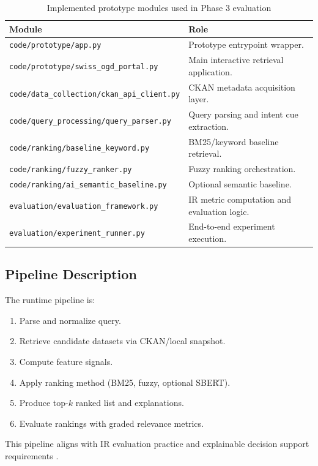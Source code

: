 \documentclass[11pt,a4paper]{article}
\begin{document}
\begin{table}[H]
\centering
\begin{tabular}{p{} p{}}
\toprule
\textbf{Module} & \textbf{Role} \\
\midrule
\texttt{code/prototype/app.py} & Prototype entrypoint wrapper. \\
\texttt{code/prototype/swiss\_ogd\_portal.py} & Main interactive retrieval application. \\
\texttt{code/data\_collection/ckan\_api\_client.py} & CKAN metadata acquisition layer. \\
\texttt{code/query\_processing/query\_parser.py} & Query parsing and intent cue extraction. \\
\texttt{code/ranking/baseline\_keyword.py} & BM25/keyword baseline retrieval. \\
\texttt{code/ranking/fuzzy\_ranker.py} & Fuzzy ranking orchestration. \\
\texttt{code/ranking/ai\_semantic\_baseline.py} & Optional semantic baseline. \\
\texttt{evaluation/evaluation\_framework.py} & IR metric computation and evaluation logic. \\
\texttt{evaluation/experiment\_runner.py} & End-to-end experiment execution. \\
\bottomrule
\end{tabular}
\caption{Implemented prototype modules used in Phase 3 evaluation}
\label{tab:modules}
\end{table}

\subsection{Pipeline Description}

The runtime pipeline is:
\begin{enumerate}
  \item Parse and normalize query.
  \item Retrieve candidate datasets via CKAN/local snapshot.
  \item Compute feature signals.
  \item Apply ranking method (BM25, fuzzy, optional SBERT).
  \item Produce top-$k$ ranked list and explanations.
  \item Evaluate rankings with graded relevance metrics.
\end{enumerate}

This pipeline aligns with IR evaluation practice and explainable decision support requirements \citep{manning2008,jarvelin2002}.
\end{document}

